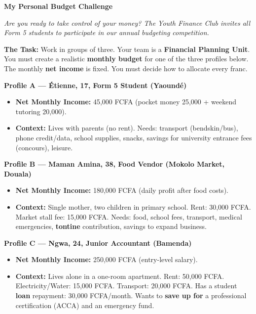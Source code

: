 \documentclass[11pt]{article}
\newcounter{popsec}
\newcounter{popsub}
\newcommand{\courssub}[1]{%
  \stepcounter{popsub}%
  \par\vspace{9pt}\noindent{\popxbold\fontsize{11.5}{13}\selectfont\color{popink}{\color{poporange}\thepopsec.\thepopsub}\hspace{6pt}#1}\par\nopagebreak\vspace{4pt}
}
\begin{document}
\courssub{Situation}
\begin{textebox}
\textbf{My Personal Budget Challenge}

\textit{Are you ready to take control of your money? The Youth Finance Club invites all Form 5 students to participate in our annual budgeting competition.}

\textbf{The Task:}
Work in groups of three. Your team is a \textbf{Financial Planning Unit}. You must create a realistic \textbf{monthly budget} for one of the three profiles below. The monthly \textbf{net income} is fixed. You must decide how to allocate every franc.

\textbf{Profile A — Étienne, 17, Form 5 Student (Yaoundé)}
\begin{itemize}
    \item \textbf{Net Monthly Income:} 45,000 FCFA (pocket money 25,000 + weekend tutoring 20,000).
    \item \textbf{Context:} Lives with parents (no rent). Needs: transport (bendskin/bus), phone credit/data, school supplies, snacks, savings for university entrance fees (concours), leisure.
\end{itemize}

\textbf{Profile B — Maman Amina, 38, Food Vendor (Mokolo Market, Douala)}
\begin{itemize}
    \item \textbf{Net Monthly Income:} 180,000 FCFA (daily profit after food costs).
    \item \textbf{Context:} Single mother, two children in primary school. Rent: 30,000 FCFA. Market stall fee: 15,000 FCFA. Needs: food, school fees, transport, medical emergencies, \textbf{tontine} contribution, savings to expand business.
\end{itemize}

\textbf{Profile C — Ngwa, 24, Junior Accountant (Bamenda)}
\begin{itemize}
    \item \textbf{Net Monthly Income:} 250,000 FCFA (entry-level salary).
    \item \textbf{Context:} Lives alone in a one-room apartment. Rent: 50,000 FCFA. Electricity/Water: 15,000 FCFA. Transport: 20,000 FCFA. Has a student \textbf{loan} repayment: 30,000 FCFA/month. Wants to \textbf{save up for} a professional certification (ACCA) and an emergency fund.
\end{itemize}


\end{textebox}
\end{document}
